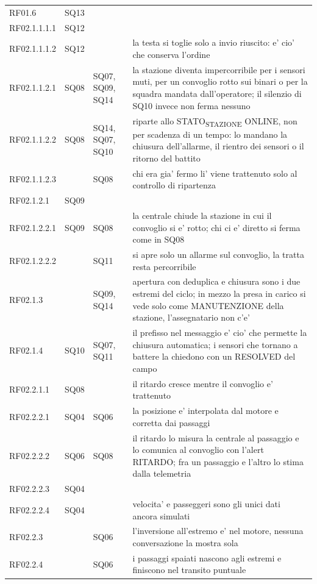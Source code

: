 \documentclass[11pt]{article}
\begin{document}
{\begin{longtable}{L{0.13\textwidth}L{0.13\textwidth}L{0.13\textwidth}L{0.48\textwidth}}
RF01.6 & SQ13 &  & \\
RF02.1.1.1.1 & SQ12 &  & \\
RF02.1.1.1.2 & SQ12 &  & la testa si toglie solo a invio riuscito: e' cio' che conserva l'ordine\\
RF02.1.1.2.1 & SQ08 & SQ07, SQ09, SQ14 & la stazione diventa impercorribile per i sensori muti, per un convoglio rotto sui binari o per la squadra mandata dall'operatore; il silenzio di SQ10 invece non ferma nessuno\\
RF02.1.1.2.2 & SQ08 & SQ14, SQ07, SQ10 & riparte allo STATO\textsubscript{STAZIONE} ONLINE, non per scadenza di un tempo: lo mandano la chiusura dell'allarme, il rientro dei sensori o il ritorno del battito\\
RF02.1.1.2.3 &  & SQ08 & chi era gia' fermo li' viene trattenuto solo al controllo di ripartenza\\
RF02.1.2.1 & SQ09 &  & \\
RF02.1.2.2.1 & SQ09 & SQ08 & la centrale chiude la stazione in cui il convoglio si e' rotto; chi ci e' diretto si ferma come in SQ08\\
RF02.1.2.2.2 &  & SQ11 & si apre solo un allarme sul convoglio, la tratta resta percorribile\\
RF02.1.3 &  & SQ09, SQ14 & apertura con deduplica e chiusura sono i due estremi del ciclo; in mezzo la presa in carico si vede solo come MANUTENZIONE della stazione, l'assegnatario non c'e'\\
RF02.1.4 & SQ10 & SQ07, SQ11 & il prefisso nel messaggio e' cio' che permette la chiusura automatica; i sensori che tornano a battere la chiedono con un RESOLVED del campo\\
RF02.2.1.1 & SQ08 &  & il ritardo cresce mentre il convoglio e' trattenuto\\
RF02.2.2.1 & SQ04 & SQ06 & la posizione e' interpolata dal motore e corretta dai passaggi\\
RF02.2.2.2 & SQ06 & SQ08 & il ritardo lo misura la centrale al passaggio e lo comunica al convoglio con l'alert RITARDO; fra un passaggio e l'altro lo stima dalla telemetria\\
RF02.2.2.3 & SQ04 &  & \\
RF02.2.2.4 & SQ04 &  & velocita' e passeggeri sono gli unici dati ancora simulati\\
RF02.2.3 &  & SQ06 & l'inversione all'estremo e' nel motore, nessuna conversazione la mostra sola\\
RF02.2.4 &  & SQ06 & i passaggi spaiati nascono agli estremi e finiscono nel transito puntuale\\

\end{longtable}}
\end{document}
